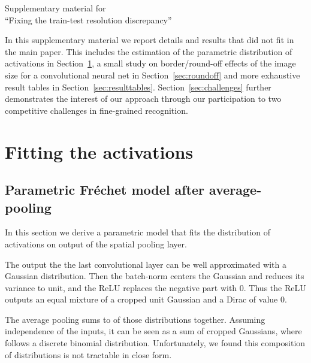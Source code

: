 \documentclass{article}
\begin{document}


\clearpage \newpage \appendix 





\onecolumn
\begin{minipage}{\textwidth}
\begin{center}
\Huge
Supplementary material for \\
``Fixing the train-test resolution discrepancy''
\end{center}
\end{minipage}


\vspace*{1cm}


In this supplementary material we report details and results that did not fit in the main paper.
This includes the estimation of the parametric distribution of activations in Section~\ref{sec:parametricfit}, a small study on border/round-off effects of the image size for a convolutional neural net in Section~\ref{sec:roundoff} and more exhaustive result tables in Section~\ref{sec:resulttables}. Section~\ref{sec:challenges} further demonstrates the interest of our approach through our participation to two competitive challenges in fine-grained recognition.




\section{Fitting the activations}
\label{sec:parametricfit}

\subsection{Parametric Fr\'echet model after average-pooling}
In this section we derive a parametric model that fits the distribution of activations on output of the spatial pooling layer. 

The output the the last convolutional layer can be well approximated with a Gaussian distribution. 
Then the batch-norm centers the Gaussian and reduces its variance to unit, and the ReLU replaces the negative part with 0. 
Thus the ReLU outputs an equal mixture of a cropped unit Gaussian and a Dirac of value 0.

The average pooling sums  to  of those distributions together.
Assuming independence of the inputs, it can be seen as a sum of  cropped Gaussians, where  follows a discrete binomial distribution. 
Unfortunately, we found this composition of distributions is not tractable in close form. 
\end{document}
